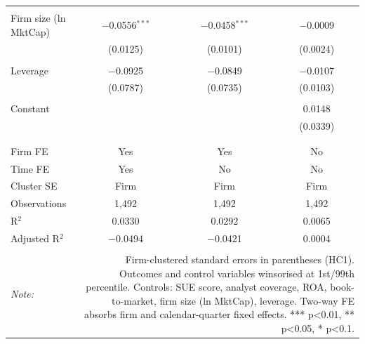 \begin{table}[!htbp]
\begin{tabular}{@{\extracolsep{5pt}}lccc}
  & & & \\ 
 Firm size (ln MktCap) & $-$0.0556$^{***}$ & $-$0.0458$^{***}$ & $-$0.0009 \\ 
  & (0.0125) & (0.0101) & (0.0024) \\ 
  & & & \\ 
 Leverage & $-$0.0925 & $-$0.0849 & $-$0.0107 \\ 
  & (0.0787) & (0.0735) & (0.0103) \\ 
  & & & \\ 
 Constant &  &  & 0.0148 \\ 
  &  &  & (0.0339) \\ 
  & & & \\ 
\hline \\[-1.8ex] 
Firm FE & Yes & Yes & No \\ 
Time FE & Yes & No & No \\ 
Cluster SE & Firm & Firm & Firm \\ 
Observations & 1,492 & 1,492 & 1,492 \\ 
R$^{2}$ & 0.0330 & 0.0292 & 0.0065 \\ 
Adjusted R$^{2}$ & $-$0.0494 & $-$0.0421 & 0.0004 \\ 
\hline 
\hline \\[-1.8ex] 
\textit{Note:}  & \multicolumn{3}{r}{Firm-clustered standard errors in parentheses (HC1). Outcomes and control variables winsorised at 1st/99th percentile. Controls: SUE score, analyst coverage, ROA, book-to-market, firm size (ln MktCap), leverage. Two-way FE absorbs firm and calendar-quarter fixed effects. *** p<0.01, ** p<0.05, * p<0.1.} \\ 
\end{tabular} 
\end{table} 
